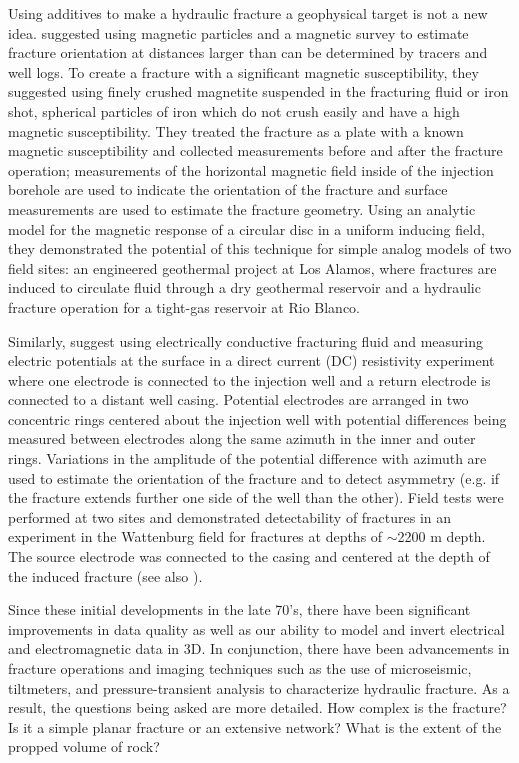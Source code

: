 Using additives to make a hydraulic fracture a geophysical target is not a new idea. \cite{Byerlee1976} suggested using magnetic particles and a magnetic survey to estimate fracture orientation at distances larger than can be determined by tracers and well logs. To create a fracture with a significant magnetic susceptibility, they suggested using finely crushed magnetite suspended in the fracturing fluid or iron shot, spherical particles of iron which do not crush easily and have a high magnetic susceptibility. They treated the fracture as a plate with a known magnetic susceptibility and collected measurements before and after the fracture operation; measurements of the horizontal magnetic field inside of the injection borehole are used to indicate the orientation of the fracture and surface measurements are used to estimate the fracture geometry. Using an analytic model for the magnetic response of a circular disc in a uniform inducing field, they demonstrated the potential of this technique for simple analog models of two field sites: an engineered geothermal project at Los Alamos, where fractures are induced to circulate fluid through a dry geothermal reservoir and a hydraulic fracture operation for a tight-gas reservoir at Rio Blanco.

Similarly, \cite{Bartel1976} suggest using electrically conductive fracturing fluid and measuring electric potentials at the surface in a direct current (DC) resistivity experiment where one electrode is connected to the injection well and a return electrode is connected to a distant well casing. Potential electrodes are arranged in two concentric rings centered about the injection well with potential differences being measured between electrodes along the same azimuth in the inner and outer rings. Variations in the amplitude of the potential difference with azimuth are used to estimate the orientation of the fracture and to detect asymmetry (e.g. if the fracture extends further one side of the well than the other). Field tests were performed at two sites and demonstrated detectability of fractures in an experiment in the Wattenburg field for fractures at depths of $\sim$2200 m depth. The source electrode was connected to the casing and centered at the depth of the induced fracture (see also \cite{Smith1978}).

Since these initial developments in the late 70's, there have been significant improvements in data quality as well as our ability to model and invert electrical and electromagnetic data in 3D. In conjunction, there have been advancements in fracture operations and imaging techniques such as the use of microseismic, tiltmeters, and pressure-transient analysis to characterize hydraulic fracture. As a result, the questions being asked are more detailed. How complex is the fracture? Is it a simple planar fracture or an extensive network? What is the extent of the propped volume of rock?

